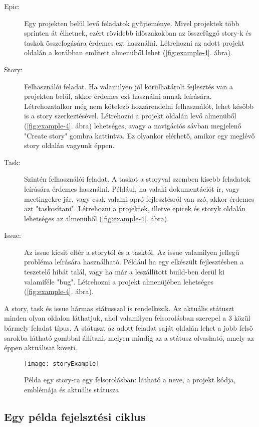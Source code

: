 \begin{description}
	\item[Epic:] Egy projekten belül levő feladatok gyűjteménye. Mivel projektek több sprinten át élhetnek, ezért rövidebb időszakokban az összefüggő story-k és taskok összefogására érdemes ezt használni. Létrehozni az adott projekt oldalán a korábban említett almenüből lehet (\ref{fig:example-4}. ábra). 
	\item[Story:] Felhasználói feladat. Ha valamilyen jól körülhatárolt fejlesztés van a projekten belül, akkor érdemes ezt használni annak leírására. Létrehozatalkor még nem kötelező hozzárendelni felhasználót, lehet később is a story szerkeztésével. Létrehozni a projekt oldalán levő almenüből (\ref{fig:example-4}. ábra) lehetséges, avagy a navigációs sávban megjelenő "Create story" gombra kattintva. Ez olyankor elérhető, amikor egy meglévő story oldalán vagyunk éppen.
	\item[Task:] Szintén felhasználói feladat. A taskot a storyval szemben kisebb feladatok leírására érdemes használni. Például, ha valaki dokumentációt ír, vagy meetingekre jár, vagy csak valami apró fejlesztésről van szó, akkor érdemes azt "taskosítani". Létrehozni a projektek, illetve epicek és storyk oldalán lehetséges az almenüből (\ref{fig:example-4}. ábra). 
	\item[Issue:] Az issue kicsit eltér a storytól és a tasktól. Az issue valamilyen jellegű probléma leírására használható. Például ha egy elkészült fejlesztésben a teszetelő hibát talál, vagy ha már a leszállított build-ben derül ki valamiféle "bug". Létrehozni a projekt almenüjében lehetséges (\ref{fig:example-4}. ábra).
\end{description}

A story, task és issue hármas státusszal is rendelkezik. Az aktuális státuszt minden olyan oldalon láthatjuk, ahol valamilyen felsorolásban szerepel a 3 közül bármely feladat típus. A státuszt az adott feladat saját oldalán lehet a jobb felső sarokba látható gombbal állítani, melyen mindig az a státusz olvasható, amely az éppen aktuálisat követi.

\begin{figure}[H]
	\centering
	\texttt{[image: storyExample]}
	\caption{Példa egy story-ra egy felsorolásban: látható a neve, a projekt kódja, emblémája és aktuális státusza}
	\label{fig:example-6}
\end{figure}

\subsection{Egy példa fejelsztési ciklus}
\label{example_workflow}

